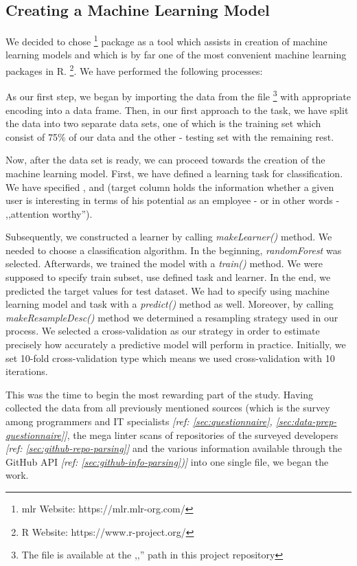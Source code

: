 \subsection{Creating a Machine Learning Model}
\label{sec:creating-machine-learning-model}

We decided to chose  \footnote{mlr Website: https://mlr.mlr-org.com/} package as a tool which assists in creation of machine learning models and which is by far one of the most convenient machine learning packages in R. \footnote{R Website: https://www.r-project.org/}. We have performed the following processes:

As our first step, we began by importing the data from the  file \footnote{The  file is available at the ,,'' path in this project repository} with appropriate   encoding into a data frame.
Then, in our first approach to the task, we have split the data into two separate data sets, one of which is the training set which consist of 75\% of our data and the other - testing set with the remaining rest. 

Now, after the data set is ready, we can proceed towards the creation of the machine learning model. First, we have defined a learning task for classification. We have specified ,  and  (target column holds the information whether a given user is interesting in terms of his potential as an employee - or in other words - ,,attention worthy''). 

Subsequently, we constructed a learner by calling \emph{makeLearner()} method. We needed to choose a classification algorithm. In the beginning, \emph{randomForest} was selected. Afterwards, we trained the model with a \emph{train()} method. We were supposed to specify train subset, use defined task and learner. In the end, we predicted the target values for test dataset. We had to specify using machine learning model and task with a \emph{predict()} method as well. Moreover, by calling \emph{makeResampleDesc()} method we determined a resampling strategy used in our process. We selected a cross-validation as our strategy in order to estimate precisely how accurately a predictive model will perform in practice. Initially, we set 10-fold cross-validation type which means we used cross-validation with 10 iterations.


This was the time to begin the most rewarding part of the study. Having collected the data from all previously mentioned sources (which is the survey among programmers and IT specialists \textit{[ref: \ref{sec:questionnaire}, \ref{sec:data-prep-questionnaire}]}, the mega linter scans of repositories of the surveyed developers \textit{[ref: \ref{sec:github-repo-parsing}]} and the various information available through the GitHub API \textit{[ref: \ref{sec:github-info-parsing})]} into one single  file, we began the work. 


